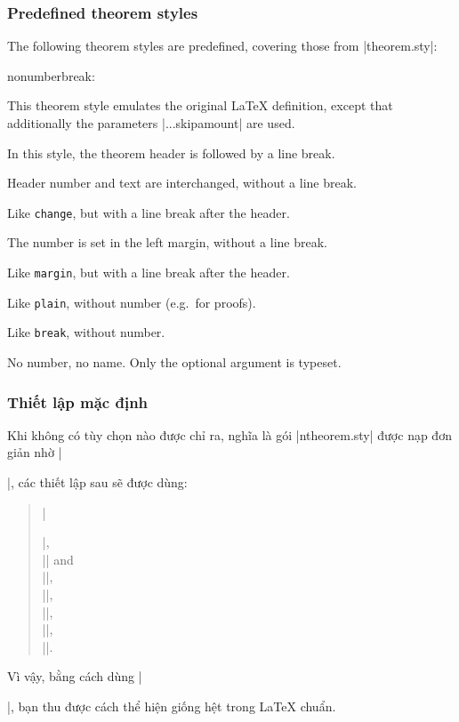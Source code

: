 \documentclass[11pt,oneside]{ltxdoc}
\theoremstyle{marginbreak}
\theoremstyle{changebreak}
\theoremstyle{change}
\theoremstyle{plain}
\theoremstyle{nonumberplain}
\begin{document}
\subsubsection{Predefined theorem styles}\label{sec:predefdstyles}

The following theorem styles are predefined, covering those
from |theorem.sty|:
\begin{deflist}{nonumberbreak:}
   \item[plain]
      This theorem style emulates the original \LaTeX{} definition,
      except that additionally the parameters
      |\theorem...skipamount| are used.
   \item[break]
      In this style, the theorem header is followed by a line
      break.
   \item[change]
      Header number and text are interchanged, without a line break.
   \item[changebreak]
      Like \texttt{change}, but with a line break after the header.
   \item[margin]
      The number is set in the left margin, without a line break.
   \item[marginbreak]
      Like \texttt{margin}, but with a line break after the header.
   \item[nonumberplain]
      Like \texttt{plain}, without number (e.g.\ for proofs).
   \item[nonumberbreak]
      Like \texttt{break}, without number.
   \item[empty]
      No number, no name. Only the optional argument is typeset.
\end{deflist}

\subsubsection{Thiết lập mặc định}

Khi không có tùy chọn nào được chỉ ra, nghĩa là gói |ntheorem.sty|
được nạp đơn giản nhờ |\usepackage{ntheorem}|, các thiết lập sau
sẽ được dùng:
\begin{quote} 
|\theoremstyle{plain}|,\\
|\theoremheaderfont{\normalfont\bfseries}| and\\
|\theorembodyfont{\itshape}|,\\
|\theoremseparator{}|,\\
||,\\
||, \\
|\theoremsymbol{}|.
\end{quote}
Vì vậy, bằng cách dùng |\newtheorem{...}{...}|, bạn thu được
cách thể hiện giống hệt trong \LaTeX{} chuẩn.
\end{document}
